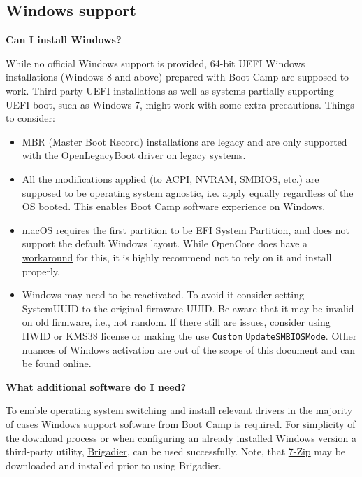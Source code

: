 \documentclass[]{article}
\begin{document}
\subsection{Windows support}\label{troubleshootingwin}

  \textbf{Can I install Windows?}

  While no official Windows support is provided, 64-bit UEFI Windows installations (Windows 8 and
  above) prepared with Boot Camp are supposed to work. Third-party UEFI installations
  as well as systems partially supporting UEFI boot, such as Windows 7, might work with
  some extra precautions. Things to consider:

  \begin{itemize}
  \item MBR (Master Boot Record) installations are legacy and are only supported
  with the OpenLegacyBoot driver on legacy systems.
  \item All the modifications applied (to ACPI, NVRAM, SMBIOS, etc.) are supposed
  to be operating system agnostic, i.e. apply equally regardless of the OS booted.
  This enables Boot Camp software experience on Windows.
  \item macOS requires the first partition to be EFI System Partition, and does
  not support the default Windows layout. While OpenCore does have a
  \href{https://github.com/acidanthera/bugtracker/issues/327}{workaround}
  for this, it is highly recommend not to rely on it and install properly.
  \item Windows may need to be reactivated. To avoid it consider
  setting SystemUUID to the original firmware UUID. Be aware that it may be invalid
  on old firmware, i.e., not random. If there still are issues,
  consider using HWID or KMS38 license or making the use \texttt{Custom}
  \texttt{UpdateSMBIOSMode}. Other nuances of Windows activation are out of the
  scope of this document and can be found online.
  \end{itemize}

  \textbf{What additional software do I need?}

  To enable operating system switching and install relevant drivers in the majority of
  cases Windows support software from
  \href{https://support.apple.com/boot-camp}{Boot Camp} is required. For simplicity of the download
  process or when configuring an already installed Windows version a third-party utility,
  \href{https://github.com/timsutton/brigadier}{Brigadier}, can be used successfully.
  Note, that \href{https://www.7-zip.org}{7-Zip} may be downloaded and installed
  prior to using Brigadier.
\end{document}
